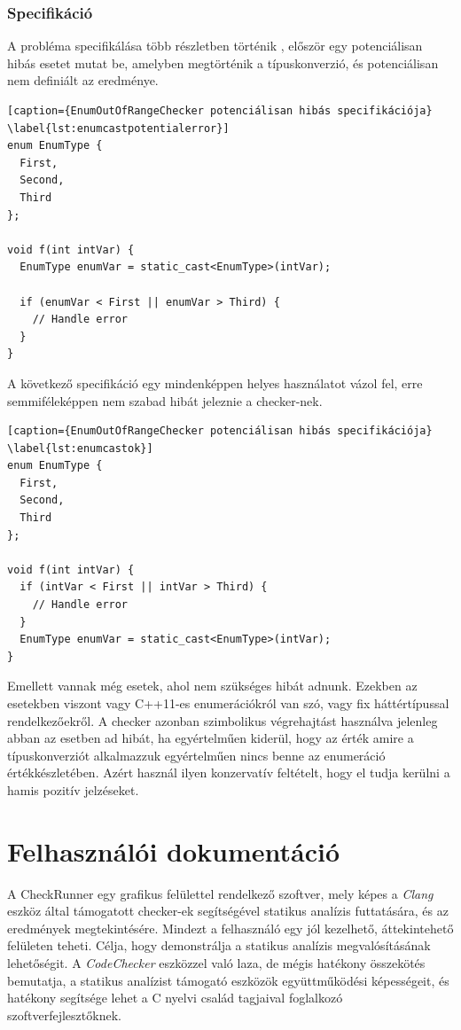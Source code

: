 \documentclass[a4paper,12pt]{report}
\begin{document}
\subsection{Specifikáció}
A probléma specifikálása több részletben történik \cite{securecodingint50}, először egy potenciálisan hibás esetet mutat be, amelyben megtörténik a típuskonverzió, és potenciálisan nem definiált az eredménye.

\begin{lstlisting}[caption={EnumOutOfRangeChecker potenciálisan hibás specifikációja}
\label{lst:enumcastpotentialerror}]
enum EnumType {
  First,
  Second,
  Third
};
 
void f(int intVar) {
  EnumType enumVar = static_cast<EnumType>(intVar);
 
  if (enumVar < First || enumVar > Third) {
    // Handle error
  }
}
\end{lstlisting}

A következő specifikáció egy mindenképpen helyes használatot vázol fel, erre semmiféleképpen nem szabad hibát jeleznie a checker-nek.

\begin{lstlisting}[caption={EnumOutOfRangeChecker potenciálisan hibás specifikációja}
\label{lst:enumcastok}]
enum EnumType {
  First,
  Second,
  Third
};
 
void f(int intVar) {
  if (intVar < First || intVar > Third) {
    // Handle error
  }
  EnumType enumVar = static_cast<EnumType>(intVar);
}
\end{lstlisting}

Emellett vannak még esetek, ahol nem szükséges hibát adnunk. Ezekben az esetekben viszont vagy C++11-es enumerációkról van szó, vagy fix háttértípussal rendelkezőekről. A checker azonban szimbolikus végrehajtást használva jelenleg abban az esetben ad hibát, ha egyértelműen kiderül, hogy az érték amire a típuskonverziót alkalmazzuk egyértelműen nincs benne az enumeráció értékkészletében. Azért használ ilyen konzervatív feltételt, hogy el tudja kerülni a hamis pozitív jelzéseket.

\chapter{Felhasználói dokumentáció}
A CheckRunner egy grafikus felülettel rendelkező szoftver, mely képes a \emph{Clang} eszköz által támogatott checker-ek segítségével statikus analízis futtatására, és az eredmények megtekintésére. Mindezt a felhasználó egy jól kezelhető, áttekintehető felületen teheti. Célja, hogy demonstrálja a statikus analízis megvalósításának lehetőségit. A \emph{CodeChecker} eszközzel való laza, de mégis hatékony összekötés bemutatja, a statikus analízist támogató eszközök együttműködési képességeit, és hatékony segítsége lehet a C nyelvi család tagjaival foglalkozó szoftverfejlesztőknek.
\end{document}

